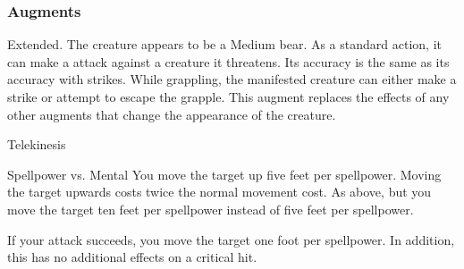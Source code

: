 \subsubsection{Augments}
 Extended.
The creature appears to be a Medium bear.
As a standard action, it can make a  attack against a creature it threatens.
Its accuracy is the same as its accuracy with strikes.
While grappling, the manifested creature can either make a strike or attempt to escape the grapple.
This augment replaces the effects of any other augments that change the appearance of the creature.
\begin{spellsection}{Telekinesis}
\begin{spellcontent}
\begin{spelltargetinginfo}
\end{spelltargetinginfo}
\begin{spelleffects}
\begin{spellattack}{Spellpower vs. Mental}
\spellsuccess
You move the target up five feet per spellpower. Moving the target upwards costs twice the normal movement cost.
\spellcritical
As above, but you move the target ten feet per spellpower instead of five feet per spellpower.
\end{spellattack}
\end{spelleffects}
\end{spellcontent}
\begin{spellfooter}
\miscastexplode
\end{spellfooter}
\begin{spellcantrip}
If your attack succeeds, you move the target one foot per spellpower. In addition, this has no additional effects on a critical hit.
\end{spellcantrip}
\end{spellsection}
